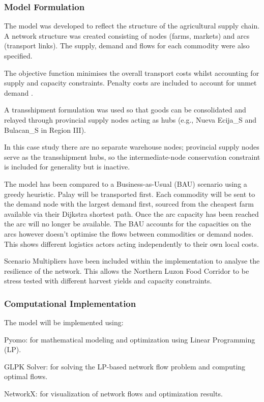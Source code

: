 \documentclass{icsthesis}
\begin{document}
\begin{mainmatter}
\subsubsection{Model Formulation}
The model was developed to reflect the structure of the agricultural supply chain. A network structure was created consisting of nodes (farms, markets) and arcs (transport links). The supply, demand and flows for each commodity were also specified.

The objective function minimises the overall transport costs whilst accounting for supply and capacity constraints. Penalty costs are included to account for unmet demand \citep{rodrigo2018}.

A transshipment formulation was used so that goods can be consolidated and relayed through provincial supply nodes acting as hubs (e.g., Nueva Ecija\_S and Bulacan\_S in Region III).

In this case study there are no separate warehouse nodes; provincial supply nodes serve as the transshipment hubs, so the intermediate-node conservation constraint is included for generality but is inactive.

The model has been compared to a Business-as-Usual (BAU) scenario using a greedy heuristic. Palay will be transported first. Each commodity will be sent to the demand node with the largest demand first, sourced from the cheapest farm available via their Dijkstra shortest path. Once the arc capacity has been reached the arc will no longer be available. The BAU accounts for the capacities on the arcs however doesn’t optimise the flows between commodities or demand nodes. This shows different logistics actors acting independently to their own local costs.

Scenario Multipliers have been included within the implementation to analyse the resilience of the network. This allows the Northern Luzon Food Corridor to be stress tested with different harvest yields and capacity constraints.


\subsubsection{Computational Implementation}
The model will be implemented using:

Pyomo: for mathematical modeling and optimization using Linear Programming (LP).

GLPK Solver: for solving the LP-based network flow problem and computing optimal flows.

NetworkX: for visualization of network flows and optimization results.


\end{mainmatter}
\end{document}
